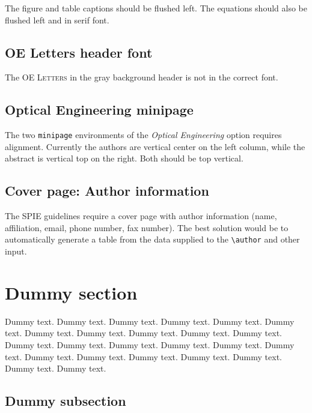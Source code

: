 \documentclass[10pt,letterpaper,optenglett,fleqn]{article}      %
\begin{document}
The figure and table captions should be flushed left. The equations
should also be flushed left and in serif font.


\subsection{OE Letters header font}

The \textsc{OE Letters} in the gray background header is not in the
correct font.


\subsection{Optical Engineering minipage}

The two \verb+minipage+ environments of the \emph{Optical
Engineering} option requires alignment. Currently the authors are
vertical center on the left column, while the abstract is vertical
top on the right. Both should be top vertical.




\subsection{Cover page: Author information}

The SPIE guidelines require a cover page with author information
(name, affiliation, email, phone number, fax number). The best
solution would be to automatically generate a table from the data
supplied to the \verb+\author+ and other input.


\section{Dummy section}

Dummy text. Dummy text. Dummy text. Dummy text. Dummy text. Dummy
text. Dummy text. Dummy text. Dummy text. Dummy text. Dummy text.
Dummy text. Dummy text. Dummy text. Dummy text. Dummy text. Dummy
text. Dummy text. Dummy text. Dummy text. Dummy text. Dummy text.
Dummy text. Dummy text.


\subsection{Dummy subsection}
\end{document}
